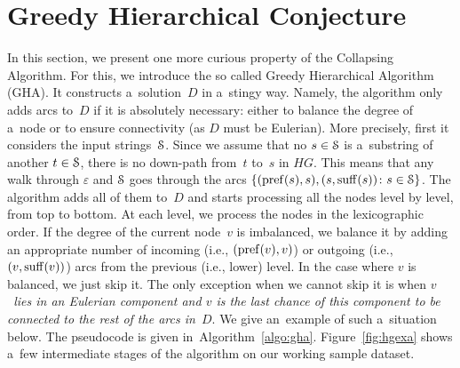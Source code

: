 \clearpage
\section{Greedy Hierarchical Conjecture}
In this section, we present one more curious property of the Collapsing Algorithm. For this, we introduce the so called Greedy Hierarchical Algorithm (GHA).
It constructs a~solution~$D$ in a~stingy way. 
Namely, the algorithm only adds arcs to~$D$ 
if it is absolutely necessary: either to balance the degree of a~node or to ensure connectivity 
(as $D$ must be Eulerian). 
More precisely, first it considers the input
strings~${\cal S}$. Since we assume that 
no $s \in {\cal S}$ is a~substring of another 
$t \in {\cal S}$, there is no down-path from~$t$ to~$s$ in $HG$. 
This means that any walk through $\varepsilon$ and ${\cal S}$ goes through the arcs $\{(\operatorname{pref}(s), s), (s, \operatorname{suff}(s)) \colon s \in {\cal S}\}$. The algorithm adds all of them to~$D$ and starts processing all the nodes level by level, from top to bottom. At each level, we process the nodes in the lexicographic order. If the degree of the current node~$v$ is imbalanced, we balance it by adding an appropriate number of incoming (i.e., $(\operatorname{pref}(v),v)$) or outgoing (i.e., $(v, \operatorname{suff}(v))$) arcs from the previous (i.e., lower) level. In the case where $v$ is balanced, we just skip it. The only exception when we cannot skip it is when {\em $v$~lies in an Eulerian component and $v$ is the last chance of this component to be connected to the rest of the arcs in~$D$}. We give an~example of such a~situation below. The pseudocode is given in~Algorithm~\ref{algo:gha}. Figure~\ref{fig:hgexa} shows a~few intermediate stages of the algorithm on our working sample dataset.


